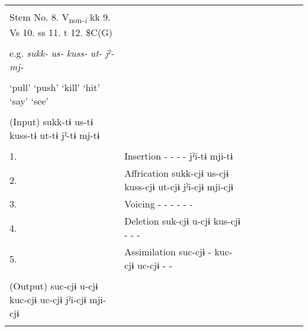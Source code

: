 \begin{table}
\begin{tabularx}{\textwidth}{XX lll lll}
                                                                                                                               \\
\tablevspace                                                                                                                   \\
  Stem No.  8. V\textsubscript{non-}\textit{\textsubscript{i}} kk  9. Vs  10. ss  11. t  12. \$C(G)                            \\
                                                                                                                               \\
  e.g.  \textit{sukk-}  \textit{us-}  \textit{kuss-}  \textit{ut-}  \textit{jˀ-}  \textit{mj-}\\                               \\
 ‘pull’  ‘push’  ‘kill’  ‘hit’  ‘say’  ‘see’                                                                                   \\
                                                                                                                               \\
  (Input)  sukk-tɨ  us-tɨ  kuss-tɨ  ut-tɨ  jˀ-tɨ  mj-tɨ                                                                        \\
\midrule                                                                                                                       \\
1.&  Insertion  -  -  -  -  jˀi-tɨ  mji-tɨ                                                                                     \\
2.&  Affrication  sukk-cjɨ  us-cjɨ  kuss-cjɨ  ut-cjɨ  jˀi-cjɨ  mji-cjɨ                                                         \\
3.&  Voicing  -  -  -  -  -  -                                                                                                 \\
4.&  Deletion  suk-cjɨ  u-cjɨ  kus-cjɨ  -  -  -                                                                                \\
5.&  Assimilation  suc-cjɨ  -  kuc-cjɨ  uc-cjɨ  -  -                                                                           \\
\midrule                                                                                                                       \\
  (Output)  suc-cjɨ  u-cjɨ  kuc-cjɨ  uc-cjɨ  jˀi-cjɨ  mji-cjɨ\\                                                                \\

\end{tabularx}
\end{table}
